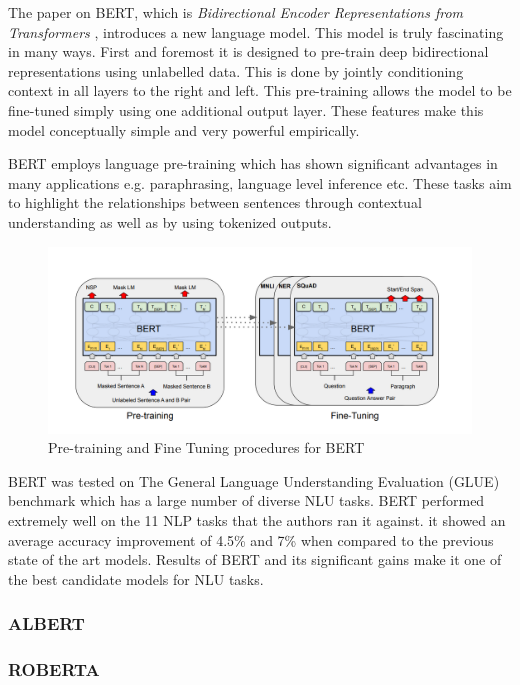 \documentclass[12pt]{report}
\begin{document}
			The paper on BERT, which is \textit{Bidirectional Encoder Representations from Transformers} \citep{bert}, introduces a new language model. This model is truly fascinating in many ways. First and foremost it is designed to pre-train deep bidirectional representations using unlabelled data. This is done by jointly conditioning context in all layers to the right and left. This pre-training allows the model to be fine-tuned simply using one additional output layer. These features make this model conceptually simple and very powerful empirically.

			BERT employs language pre-training \citep{dai} which has shown significant advantages in many applications e.g. paraphrasing, language level inference etc. These tasks aim to highlight the relationships between sentences through contextual understanding as well as by using tokenized outputs.
			\begin{figure}[h!]
				\centering
				\includegraphics[scale=0.35]{../images/BERT.png}
				\caption{Pre-training and Fine Tuning procedures for BERT \citep{bert}}\label{bertPretraining}
			\end{figure}

			BERT was tested on The General Language Understanding Evaluation (GLUE) benchmark \citep{wang} which has a large number of diverse NLU tasks.
			BERT performed extremely well on the 11 NLP tasks that the authors ran it against. it showed an average accuracy improvement of 4.5\% and 7\% when compared to the previous state of the art models. Results of BERT and its significant gains make it one of the best candidate models for NLU tasks.

	       \subsubsection{ALBERT}\label{2322}
	       \cite{albert}

	       \subsubsection{ROBERTA}\label{2323}
	       \cite{roberta}
\end{document}

